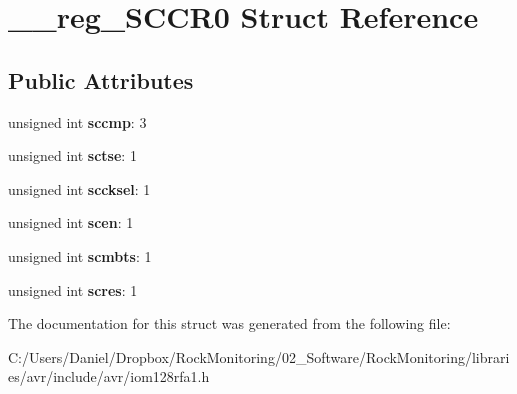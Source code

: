 \hypertarget{struct____reg___s_c_c_r0}{}\section{\+\_\+\+\_\+reg\+\_\+\+S\+C\+C\+R0 Struct Reference}
\label{struct____reg___s_c_c_r0}
\subsection*{Public Attributes}
\begin{DoxyCompactItemize}
\item 
unsigned int {\bfseries sccmp}\+: 3\hypertarget{struct____reg___s_c_c_r0_aa82cd782edf1836b209d41faf9253d32}{}\label{struct____reg___s_c_c_r0_aa82cd782edf1836b209d41faf9253d32}

\item 
unsigned int {\bfseries sctse}\+: 1\hypertarget{struct____reg___s_c_c_r0_ae6dfcb81a6359928699a5497bf974a94}{}\label{struct____reg___s_c_c_r0_ae6dfcb81a6359928699a5497bf974a94}

\item 
unsigned int {\bfseries sccksel}\+: 1\hypertarget{struct____reg___s_c_c_r0_a56300b0f86137154bb51c5c0a008b39b}{}\label{struct____reg___s_c_c_r0_a56300b0f86137154bb51c5c0a008b39b}

\item 
unsigned int {\bfseries scen}\+: 1\hypertarget{struct____reg___s_c_c_r0_a173ec932f6d2ba56549abab9c6cde0ef}{}\label{struct____reg___s_c_c_r0_a173ec932f6d2ba56549abab9c6cde0ef}

\item 
unsigned int {\bfseries scmbts}\+: 1\hypertarget{struct____reg___s_c_c_r0_a4f29685f360db4724d24a5bc2869614b}{}\label{struct____reg___s_c_c_r0_a4f29685f360db4724d24a5bc2869614b}

\item 
unsigned int {\bfseries scres}\+: 1\hypertarget{struct____reg___s_c_c_r0_a9600534c3c24810117f066ca021464a7}{}\label{struct____reg___s_c_c_r0_a9600534c3c24810117f066ca021464a7}

\end{DoxyCompactItemize}


The documentation for this struct was generated from the following file\+:\begin{DoxyCompactItemize}
\item 
C\+:/\+Users/\+Daniel/\+Dropbox/\+Rock\+Monitoring/02\+\_\+\+Software/\+Rock\+Monitoring/libraries/avr/include/avr/iom128rfa1.\+h\end{DoxyCompactItemize}
